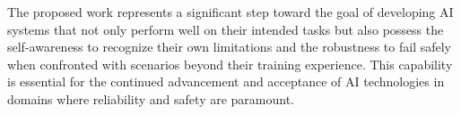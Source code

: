 \documentclass[11pt, oneside]{book}
\theoremstyle{plain}
\theoremstyle{definition}
\theoremstyle{remark}
\begin{document}
The proposed work represents a significant step toward the goal of developing AI systems that not only perform well on their intended tasks but also possess the self-awareness to recognize their own limitations and the robustness to fail safely when confronted with scenarios beyond their training experience. This capability is essential for the continued advancement and acceptance of AI technologies in domains where reliability and safety are paramount.






\begin{appendices}


\end{appendices}
\end{document}
